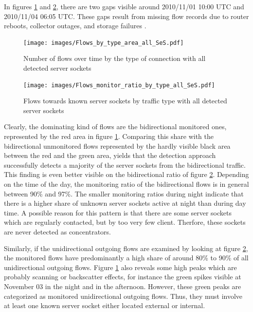 In figures \ref{fig:flows_by_type} and \ref{fig:monitored_flows_by_type}, there are two gaps visible around 2010/11/01 10:00 UTC and 2010/11/04 06:05 UTC. 
These gaps result from missing flow records due to router reboots, collector outages, and storage failures \citep{Schatzmann:Mining}.
\begin{figure}
	[ht] \centering 
	\texttt{[image: images/Flows\_by\_type\_area\_all\_SeS.pdf]} \caption{Number of flows over time by the type of connection with all detected server sockets} 
	\label{fig:flows_by_type} 
\end{figure}
\begin{figure}
	[h] \centering 
	\texttt{[image: images/Flows\_monitor\_ratio\_by\_type\_all\_SeS.pdf]} \caption{Flows towards known server sockets by traffic type with all detected server sockets} 
	\label{fig:monitored_flows_by_type} 
\end{figure}

Clearly, the dominating kind of flows are the bidirectional monitored ones, represented by the red area in figure \ref{fig:flows_by_type}. 
Comparing this share with the bidirectional unmonitored flows represented by the hardly visible black area between the red and the green area, yields that the detection approach successfully detects a majority of the \glspl{server socket} from the bidirectional traffic. 
This finding is even better visible on the bidirectional ratio of figure \ref{fig:monitored_flows_by_type}. 
Depending on the time of the day, the monitoring ratio of the bidirectional flows is in general between 90\% and 97\%. 
The smaller monitoring ratios during night indicate that there is a higher share of unknown \glspl{server socket} active at night than during day time. 
A possible reason for this pattern is that there are some \glspl{server socket} which are regularly contacted, but by too very few client.
Therfore, these sockets are never detected as concentrators.

Similarly, if the unidirectional outgoing flows are examined by looking at figure \ref{fig:monitored_flows_by_type}, the monitored flows have predominantly a high share of around 80\% to 90\% of all unidirectional outgoing flows. 
Figure \ref{fig:flows_by_type} also reveals some high peaks which are probably scanning or backscatter effects, for instance the green spikes visible at November 03 in the night and in the afternoon. 
However, these green peaks are categorized as monitored unidirectional outgoing flows. 
Thus, they must involve at least one known \gls{server socket} either located external or internal.

